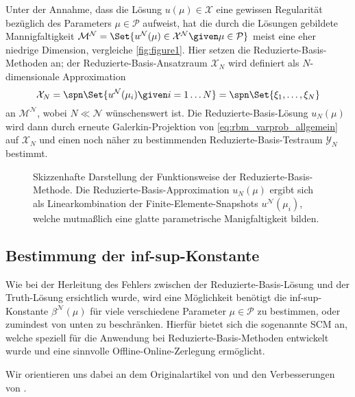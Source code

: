 Unter der Annahme, dass die Lösung $u(\mu) \in \mathcal X$ eine gewissen Regularität bezüglich des Parameters $\mu \in \mathcal P$ aufweist, hat die durch die Lösungen gebildete Mannigfaltigkeit $\mathcal M^{\mathcal N} = \Set{u^{\mathcal N}(\mu) \in \mathcal X^{\mathcal N} \given \mu \in \mathcal P}$ meist eine eher niedrige Dimension, vergleiche \autoref{fig:figure1}.
Hier setzen die Reduzierte-Basis-Methoden an; der Reduzierte-Basis-Ansatzraum $\mathcal X_{N}$ wird definiert als $N$-dimensionale Approximation
\begin{equation}
    \mathcal X_{N} = \spn\Set{u^{\mathcal N}(\mu_{i}) \given i = 1 \dots N} = \spn\Set{\xi_{1}, \dots, \xi_{N}}
\end{equation}
an $\mathcal M^{\mathcal N}$, wobei $N \ll \mathcal N$ wünschenswert ist.
Die Reduzierte-Basis-Lösung $u_{N}(\mu)$ wird dann durch erneute Galerkin-Projektion von \autoref{eq:rbm_varprob_allgemein} auf $\mathcal X_{N}$ und einen noch näher zu bestimmenden Reduzierte-Basis-Testraum $\mathcal Y_{N}$ bestimmt.

\begin{figure}[tb]
    \centering
    
    \caption[%
    Skizzenhafte Darstellung der Funktionsweise der Reduzierte-Basis-Methode.
    ]{
        Skizzenhafte Darstellung der Funktionsweise der Reduzierte-Basis-Methode.
        Die Reduzierte-Basis-Approximation $u_{N}(\mu)$ ergibt sich als Linearkombination der Finite-Elemente-Snapshots $u^{\mathcal N}(\mu_{i})$, welche mutmaßlich eine glatte parametrische Manigfaltigkeit bilden.
        }
    \label{fig:figure1}
\end{figure}

\subsection{Bestimmung der inf-sup-Konstante} %
\label{sub:bestimmung_der_inf_sup_konstante}

Wie bei der Herleitung des Fehlers zwischen der Reduzierte-Basis-Lösung und der Truth-Lösung ersichtlich wurde, wird eine Möglichkeit benötigt die inf-sup-Konstante $\beta^{\mathcal N}(\mu)$ für viele verschiedene Parameter $\mu \in \mathcal P$ zu bestimmen, oder zumindest von unten zu beschränken.
Hierfür bietet sich die sogenannte \ac{SCM} an, welche speziell für die Anwendung bei Reduzierte-Basis-Methoden entwickelt wurde und eine sinnvolle Offline-Online-Zerlegung ermöglicht.

Wir orientieren uns dabei an dem Originalartikel von \textcite{Huynh2007} und den Verbesserungen von \textcite{Chen2009}.

